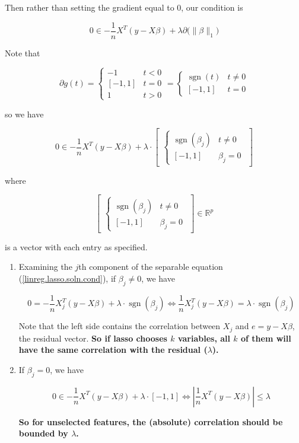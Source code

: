 Then rather than setting the gradient equal to 0, our condition is

\[
0 \in - \frac{1}{n} X^T(y - X \beta) + \lambda \partial \big( \lVert \beta \rVert_1 \big)
\]

Note that 

\[
\partial g (t) = \begin{cases}
-1 & t < 0 \\
[-1, 1] & t = 0 \\
1 & t > 0
\end{cases} = \begin{cases}
\operatorname{sgn}(t) & t \neq 0 \\
[-1, 1] & t = 0 
\end{cases}
\]

so we have

\begin{equation}\label{linreg.lasso.soln.cond}
0 \in - \frac{1}{n} X^T(y - X \beta) + \lambda \cdot \begin{bmatrix} \begin{cases}
\operatorname{sgn}(\beta_j) & t \neq 0 \\
[-1, 1] & \beta_j = 0 
\end{cases} \end{bmatrix}
\end{equation}

where 

\[
\begin{bmatrix} \begin{cases}
\operatorname{sgn}(\beta_j) & t \neq 0 \\
[-1, 1] & \beta_j = 0 
\end{cases} \end{bmatrix} \in \mathbb{R}^p
\]

is a vector with each entry as specified.

\begin{remark}
\begin{enumerate}[(1)]
\item Examining the \(j\)th component of the separable equation (\ref{linreg.lasso.soln.cond}), if \(\beta_j \neq 0\), we have

\[
0 = -\frac{1}{n} X_j^T(y - X \beta) + \lambda \cdot
\operatorname{sgn}(\beta_j) \iff \frac{1}{n} X_j^T(y - X \beta) = \lambda \cdot
\operatorname{sgn}(\beta_j) 
\]

Note that the left side contains the correlation between \(X_j\) and \(e = y - X \beta\), the residual vector. \textbf{So if lasso chooses \(k\) variables, all \(k\) of them will have the same correlation with the residual (\(\lambda\)).}

\item If \(\beta_j =0\), we have

\[
0 \in - \frac{1}{n} X^T(y - X \beta) + \lambda \cdot 
[-1, 1]  \iff \left|  \frac{1}{n} X^T(y - X \beta)  \right| \leq \lambda
\]

\textbf{So for unselected features, the (absolute) correlation should be bounded by \(\lambda\).}

\end{enumerate}

\end{remark}

